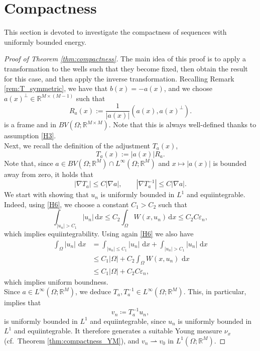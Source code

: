 \documentclass[a4paper, 11pt, reqno]{amsart}
\theoremstyle{plain}
\theoremstyle{definition}
\theoremstyle{remark}
\newcommand{\R}{\mathbb R}
\newcommand{\eps}{\varepsilon}
\newcommand{\dd}{\,\mathrm{d}}
\begin{document}



\section{Compactness}\label{sec:compactness}

This section is devoted to investigate the compactness of sequences with uniformly bounded energy.

\begin{proof}[Proof of Theorem \ref{thm:compactness}]
    The main idea of this proof is to apply a transformation to the wells such that they become fixed, then obtain the result for this case, and then apply the inverse transformation.
    Recalling Remark \ref{rem:T_symmetric}, we have that $b(x) = - a(x)$, and we choose $a(x)^\perp \in \R^{M \times (M-1)}$ such that 
    \[
        R_a(x) := \frac{1}{|a(x)|}(a(x), a(x)^\perp).
    \]
    is a frame and in $BV(\Omega;\R^{M \times M})$. Note that this is always well-defined thanks to assumption \ref{H3}.\\
    Next, we recall the definition of the adjustment $T_a(x)$,
    \[
        T_a(x) := |a(x)|R_a.
    \]
    Note that, since $a \in BV (\Omega; \R^M) \cap L^\infty (\Omega; \R^M)$ and $x\mapsto |a(x)|$ is bounded away from zero, it holds that
    \begin{equation}\label{eq:gradient_Ta}
        | \nabla T_a | \leq C | \nabla a|, \qquad | \nabla T_a^{-1} | \leq C | \nabla a|.
    \end{equation}
    We start with showing that $u_n$ is uniformly bounded in $L^1$ and equiintegrable. Indeed, using \ref{H6}, we choose a constant $C_1 > C_2$ such that 
    \[
        \int_{|u_n| > C_1} |u_n| \, \mathrm{d}x \leq C_2 \int_\Omega W(x, u_n) \, \mathrm{d}x \leq C_2C\eps_n,
    \]
    which implies equiintegrability. Using again \ref{H6} we also have 
    \begin{align*}
        \int_\Omega |u_n|\, \dd x &= \int_{|u_n|\leq C_1}|u_n| \, \dd x + \int_{|u_n| > C_1}|u_n| \, \dd x \\
        &\leq C_1|\Omega| + C_2 \int_\Omega W(x, u_n) \, \dd x\\
        &\leq C_1 | \Omega| + C_2 C \eps_n,
    \end{align*}
    which implies uniform boundness.\\
    Since $a \in L^\infty(\Omega; \R^M)$, we deduce $T_a, T_a^{-1} \in L^\infty(\Omega;\R^M)$. This, in particular, implies that 
    $$ v_n \coloneqq T_a^{-1} u_n, $$
    is uniformly bounded in $L^1$ and equiintegrable, since $u_n$ is uniformly bounded in $L^1$ and equiintegrable. It therefore generates a suitable Young measure $\nu_x$ (cf.\ Theorem \ref{thm:compactness_YM}), and $v_n \rightharpoonup v_0$ in $L^1(\Omega; \R^M)$.
    

\end{proof}
\end{document}
